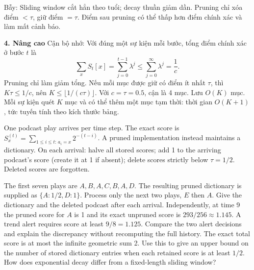 \documentclass[10pt,a4paper,twocolumn]{article}
\newcommand{\key}[1]{#1:\enspace}
\newcommand{\unitheading}[2]{%
  \par\addvspace{1pt}\noindent\textbf{#1. #2}\enspace}
\newcommand{\unitadvanced}{\unitheading{4}{Nâng cao}}
\begin{document}
\key{Bẫy} Sliding window cắt hẳn theo tuổi; decay thuần giảm dần. Pruning chỉ xóa điểm $<\tau$, giữ điểm $=\tau$. Điểm sau pruning có thể thấp hơn điểm chính xác và làm mất cảnh báo.


\unitadvanced
\key{Cận bộ nhớ} Với đúng một sự kiện mỗi bước, tổng điểm chính xác ở bước $t$ là
\[
\sum_x S_t[x]=\sum_{j=0}^{t-1}\lambda^j
    \le \sum_{j=0}^{\infty}\lambda^j=\frac{1}{c}.
\]
Pruning chỉ làm giảm tổng. Nếu mỗi mục được giữ có điểm ít nhất $\tau$, thì $K\tau\le 1/c$, nên $K\le\lfloor 1/(c\tau)\rfloor$. Với $c=\tau=0.5$, cận là 4 mục. Lưu $O(K)$ mục. Mỗi sự kiện quét $K$ mục và có thể thêm một mục tạm thời: thời gian $O(K+1)$, tức tuyến tính theo kích thước bảng.

One podcast play arrives per time step. The exact score is $S_x^{(t)}=\sum_{1\le i\le t:\,a_i=x}2^{-(t-i)}$. A pruned implementation instead maintains a dictionary. On each arrival: halve all stored scores; add 1 to the arriving podcast's score (create it at 1 if absent); delete scores strictly below $\tau=1/2$. Deleted scores are forgotten.

The first seven plays are $A,B,A,C,B,A,D$. The resulting pruned dictionary is supplied as $\{A:1/2,D:1\}$.
 Process only the next two plays, $E$ then $A$. Give the dictionary and the deleted podcast after each arrival.
 Independently, at time 9 the pruned score for $A$ is 1 and its exact unpruned score is $293/256\approx1.145$. A trend alert requires score at least $9/8=1.125$. Compare the two alert decisions and explain the discrepancy without recomputing the full history.
 The exact total score is at most the infinite geometric sum 2. Use this to give an upper bound on the number of stored dictionary entries when each retained score is at least $1/2$. How does exponential decay differ from a fixed-length sliding window?
\end{document}
